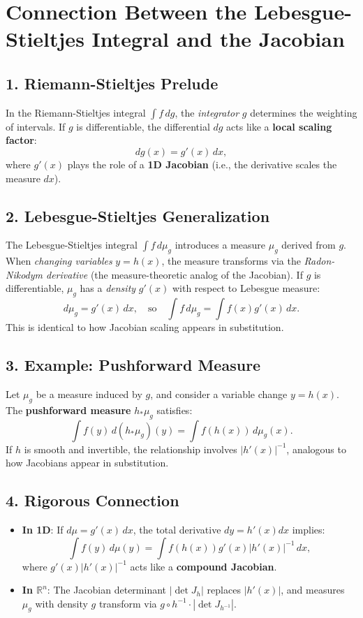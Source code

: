 \documentclass[12pt]{article}
\begin{document}
\section*{Connection Between the Lebesgue-Stieltjes Integral and the Jacobian}

\subsection*{1. Riemann-Stieltjes Prelude}
In the Riemann-Stieltjes integral \( \int f \, dg \), the \textit{integrator} \( g \) determines the weighting of intervals. If \( g \) is differentiable, the differential \( dg \) acts like a \textbf{local scaling factor}:
\[
dg(x) = g'(x) \, dx,
\]
where \( g'(x) \) plays the role of a \textbf{1D Jacobian} (i.e., the derivative scales the measure \( dx \)).

\subsection*{2. Lebesgue-Stieltjes Generalization}
The Lebesgue-Stieltjes integral \( \int f \, d\mu_g \) introduces a measure \( \mu_g \) derived from \( g \). When \textit{changing variables} \( y = h(x) \), the measure transforms via the \textit{Radon-Nikodym derivative} (the measure-theoretic analog of the Jacobian).  
If \( g \) is differentiable, \( \mu_g \) has a \textit{density} \( g'(x) \) with respect to Lebesgue measure:
\[
d\mu_g = g'(x) \, dx, \quad \text{so} \quad \int f \, d\mu_g = \int f(x) g'(x) \, dx.
\]
This is identical to how Jacobian scaling appears in substitution.

\subsection*{3. Example: Pushforward Measure}
Let \( \mu_g \) be a measure induced by \( g \), and consider a variable change \( y = h(x) \). The \textbf{pushforward measure} \( h_*\mu_g \) satisfies:
\[
\int f(y) \, d(h_*\mu_g)(y) = \int f(h(x)) \, d\mu_g(x).
\]
If \( h \) is smooth and invertible, the relationship involves \( |h'(x)|^{-1} \), analogous to how Jacobians appear in substitution.

\subsection*{4. Rigorous Connection}
\begin{itemize}
    \item \textbf{In 1D}: If \( d\mu = g'(x) \, dx \), the total derivative \( dy = h'(x) dx \) implies:
    \[
    \int f(y) \, d\mu(y) = \int f(h(x)) g'(x) |h'(x)|^{-1} \, dx,
    \]
    where \( g'(x) |h'(x)|^{-1} \) acts like a \textbf{compound Jacobian}.
    \item \textbf{In \(\mathbb{R}^n\)}: The Jacobian determinant \( |\det J_h| \) replaces \( |h'(x)| \), and measures \( \mu_g \) with density \( g \) transform via \( g \circ h^{-1} \cdot |\det J_{h^{-1}}| \).
\end{itemize}
\end{document}

